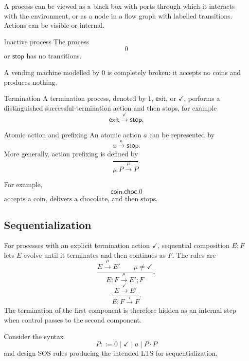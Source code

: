 \documentclass[a4paper]{article}
\newcommand{\stopproc}{\mathsf{stop}}
\newcommand{\tick}{\checkmark}
\newcommand{\trans}[1]{\xrightarrow{#1}}
\begin{document}
A process can be viewed as a black box with ports through which it interacts with the environment, or as a node in a flow graph with labelled transitions.
Actions can be visible or internal.

\begin{snippetdefinition}{Inactive process}
    The process
    \[
        0
    \]
    or \(\stopproc\) has no transitions.
\end{snippetdefinition}

A vending machine modelled by \(0\) is completely broken: it accepts no coins and produces nothing.

\begin{snippetdefinition}{Termination}
    A termination process, denoted by \(1\), \(\mathsf{exit}\), or \(\tick\), performs a distinguished successful-termination action and then stops, for example
    \[
        \mathsf{exit}\trans{\tick}\stopproc.
    \]
\end{snippetdefinition}

\begin{snippetdefinition}{Atomic action and prefixing}
    An atomic action \(a\) can be represented by
    \[
        a\trans{a}\stopproc.
    \]
    More generally, action prefixing is defined by
    \[
        \frac{}{\mu.P\trans{\mu}P}.
    \]
\end{snippetdefinition}

For example,
\[
    \mathsf{coin}.\mathsf{choc}.0
\]
accepts a coin, delivers a chocolate, and then stops.

\subsection{Sequentialization}

For processes with an explicit termination action \(\tick\), sequential composition \(E;F\) lets \(E\) evolve until it terminates and then continues as \(F\).
The rules are
\[
    \frac{E\trans{\mu}E'\qquad\mu\neq\tick}
    {E;F\trans{\mu}E';F},
\]
\[
    \frac{E\trans{\tick}E'}
    {E;F\trans{\tau}F}.
\]
The termination of the first component is therefore hidden as an internal step when control passes to the second component.

\begin{snippetexercise}{}
    Consider the syntax
    \[
        P::=0\mid\tick\mid a\mid P\cdot P
    \]
    and design SOS rules producing the intended LTS for sequentialization.
\end{snippetexercise}
\end{document}
